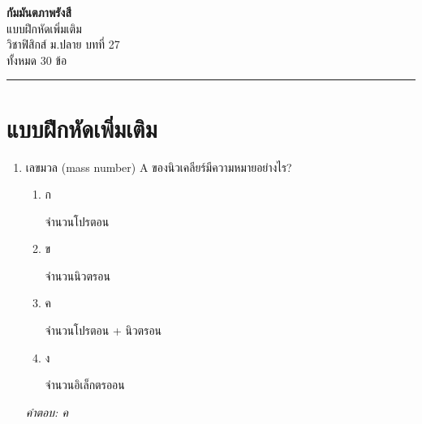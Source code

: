 \documentclass[12pt]{article}
\begin{document}
\begin{center}
{\Large\textbf{กัมมันตภาพรังสี}}\\[6pt]
{\normalsize แบบฝึกหัดเพิ่มเติม}\\[6pt]
{\normalsize วิชาฟิสิกส์ ม.ปลาย บทที่ 27}\\[4pt]
{\footnotesize ทั้งหมด 30 ข้อ}
\end{center}
\hrule
\bigskip

\section*{แบบฝึกหัดเพิ่มเติม}
\begin{enumerate}[label=\arabic*., itemsep=0.5\baselineskip, topsep=0.5\baselineskip, leftmargin=*]
\item เลขมวล (mass number) A ของนิวเคลียร์มีความหมายอย่างไร?
\begin{enumerate}[label=\alph*)., itemsep=0.3\baselineskip, topsep=0.3\baselineskip]
\item ก\ 
\begin{minipage}[t]{0.9\linewidth}
\raggedright จำนวนโปรตอน
\end{minipage}
\item ข\ 
\begin{minipage}[t]{0.9\linewidth}
\raggedright จำนวนนิวตรอน
\end{minipage}
\item ค\ 
\begin{minipage}[t]{0.9\linewidth}
\raggedright จำนวนโปรตอน + นิวตรอน
\end{minipage}
\item ง\ 
\begin{minipage}[t]{0.9\linewidth}
\raggedright จำนวนอิเล็กตรออน
\end{minipage}
\end{enumerate}
\vspace{-0.3\baselineskip}
\begin{small}
\textit{คำตอบ: ค}
\end{small}


\end{enumerate}
\end{document}
